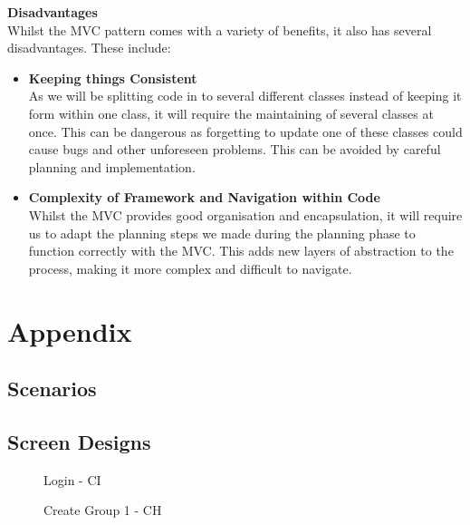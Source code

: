 \documentclass[a4paper]{article}
\begin{document}
\textbf{Disadvantages} \\
Whilst the MVC pattern comes with a variety of benefits, it also has several disadvantages. These include:
\begin{itemize}
    \item \textbf{Keeping things Consistent} \\
    As we will be splitting code in to several different classes instead of keeping it form within one class, it will require the maintaining of several classes at once. This can be dangerous as forgetting to update one of these classes could cause bugs and other unforeseen problems. This can be avoided by careful planning and implementation. \\
    \item \textbf{Complexity of Framework and Navigation within Code} \\
    Whilst the MVC provides good organisation and encapsulation, it will require us to adapt the planning steps we made during the planning phase to function correctly with the MVC. This adds new layers of abstraction to the process, making it more complex and difficult to navigate.
\end{itemize}

\section{Appendix}
\subsection{Scenarios}






\clearpage
\subsection{Screen Designs}
\begin{figure}[!ht]
    \centering{} 
    \caption{Login - CI}
    \label{fig:login}
\end{figure}

\begin{figure}[!ht] 
    \centering{} 
    \caption{Create Group 1 - CH}
    \label{fig:create_group1}
\end{figure}
\end{document}
